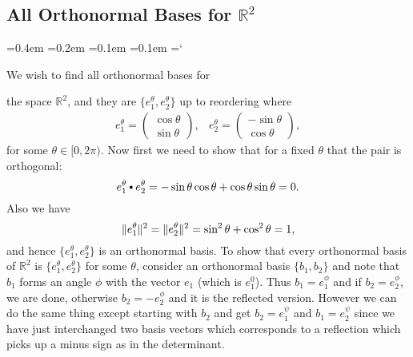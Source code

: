 
\subsection*{All Orthonormal Bases for $\mathbb{R}^2$}

{\ttfamily
{}\font=0.4em
\font=0.2em
\font=0.1em
\font=0.1em
\hyphenchar\font=`\-


\hypertarget{scripts_orthonormal_bases_sin_cos}{We wish to find all orthonormal bases for} the space $\mathbb{R}^2$, and they are $\{ e_1^{\theta}, e_2^{\theta} \}$ up to reordering where
\[
\begin{array}{cc}
e_1^{\theta} = \begin{pmatrix} \cos \theta \\ \sin \theta \end{pmatrix}, & e_2^{\theta} = \begin{pmatrix} -\sin \theta \\ \cos \theta \end{pmatrix},
\end{array}
\]
for some $\theta \in [0, 2\pi)$. Now first we need to show that for a fixed $\theta$ that the pair is orthogonal:
\[
e_1^{\theta} \dotprod e_2^{\theta} = -\sin \theta \cos \theta + \cos \theta \sin \theta = 0.
\]
Also we have
\[
\|e_1^{\theta}\|^2 = \|e_2^{\theta}\|^2 = \sin^2 \theta + \cos^2 \theta = 1,
\]
and hence $\{ e_1^{\theta}, e_2^{\theta} \}$ is an orthonormal basis. To show that every orthonormal basis of $\mathbb{R}^2$ is $\{ e_1^{\theta}, e_2^{\theta} \}$ for some $\theta$, consider an orthonormal basis $\{ b_1, b_2 \}$ and note that $b_1$ forms an angle $\phi$ with the vector $e_1$ (which is $e_1^0$). Thus $b_1 = e_1^{\phi}$ and if $b_2 = e_2^{\phi}$, we are done, otherwise $b_2 = -e_2^{\phi}$ and it is the reflected version. However we can do the same thing except starting with $b_2$ and get $b_2 = e_1^{\psi}$ and $b_1 = e_2^{\psi}$ since we have just interchanged two basis vectors which corresponds to a reflection which picks up a minus sign as in the determinant.

}
